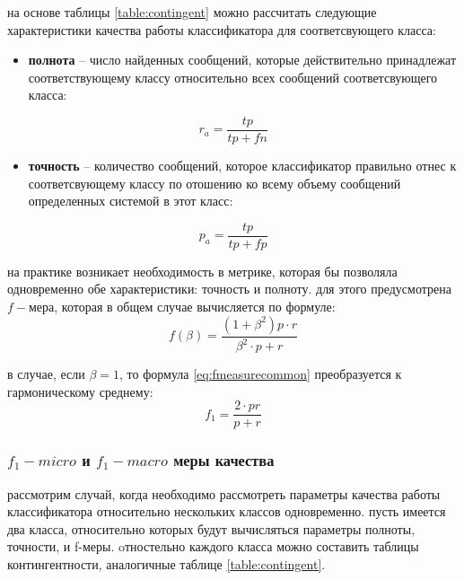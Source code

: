      на основе таблицы \ref{table:contingent} можно рассчитать следующие
     характеристики качества работы классификатора для соответсвующего класса:
    \begin{itemize}
        \item {\bf полнота} -- число найденных сообщений, которые
            действительно принадлежат соответствующему классу относительно всех
            сообщений соответсвующего класса:

            \begin{equation}
                \label{eq:recall}
                r_a = \dfrac{tp}{tp + fn} \hspace{20pt}
            \end{equation}

        \item {\bf точность} -- количество сообщений, которое
            классификатор правильно отнес к соответсвующему классу по отошению
            ко всему объему сообщений определенных системой в этот класс:

            \begin{equation}
                \label{eq:precision}
                p_a = \dfrac{tp}{tp + fp} \hspace{20pt}
            \end{equation}
    \end{itemize}

        на практике возникает необходимость в метрике, которая бы позволяла одновременно
    обе характеристики: точность и полноту. для этого предусмотрена $f-мера$, которая
    в общем случае вычисляется по формуле:
    \begin{equation}
        \label{eq:fmeasurecommon}
        f(\beta) = \dfrac{(1+\beta^2) p \cdot r}{\beta^2 \cdot p + r}
    \end{equation}

    в случае, если $\beta = 1$, то формула \ref{eq:fmeasurecommon} преобразуется
    к гармоническому среднему:
    \begin{equation}
        \label{eq:fmeasure}
        f_1 = \dfrac{2 \cdot p r}{p + r}
    \end{equation}

    \subsubsection{$f_1-micro$ и $f_1-macro$ меры качества}
    рассмотрим случай, когда необходимо рассмотреть параметры качества работы
    классификатора относительно нескольких классов одновременно.
    пусть имеется два класса, относительно которых будут вычисляться параметры полноты, точности,
    и f-меры.
    oтностельно каждого класса можно составить таблицы контингентности,
    аналогичные таблице \ref{table:contingent}.

